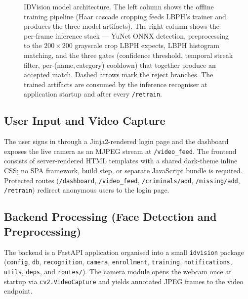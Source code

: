 \documentclass[11pt]{report}
\begin{document}
\begin{figure}[H]
    \caption{IDVision model architecture. The left column shows the offline
    training pipeline (Haar cascade cropping feeds LBPH's trainer and
    produces the three model artifacts). The right column shows the
    per-frame inference stack — YuNet ONNX detection, preprocessing to the
    $200\times200$ grayscale crop LBPH expects, LBPH histogram matching,
    and the three gates (confidence threshold, temporal streak filter,
    per-(name,\,category) cooldown) that together produce an accepted
    match. Dashed arrows mark the reject branches. The trained artifacts
    are consumed by the inference recogniser at application startup and
    after every \texttt{/retrain}.}
    \label{fig:model-architecture}
\end{figure}

\subsection{User Input and Video Capture}
The user signs in through a Jinja2-rendered login page and the dashboard exposes the live camera as an MJPEG stream at \texttt{/video\_feed}. The frontend consists of server-rendered HTML templates with a shared dark-theme inline CSS; no SPA framework, build step, or separate JavaScript bundle is required. Protected routes (\texttt{/dashboard}, \texttt{/video\_feed}, \texttt{/criminals/add}, \texttt{/missing/add}, \texttt{/retrain}) redirect anonymous users to the login page.

\subsection{Backend Processing (Face Detection and Preprocessing)}
The backend is a FastAPI application organised into a small \texttt{idvision} package (\texttt{config}, \texttt{db}, \texttt{recognition}, \texttt{camera}, \texttt{enrollment}, \texttt{training}, \texttt{notifications}, \texttt{utils}, \texttt{deps}, and \texttt{routes/}). The camera module opens the webcam once at startup via \texttt{cv2.VideoCapture} and yields annotated JPEG frames to the video endpoint.
\end{document}
